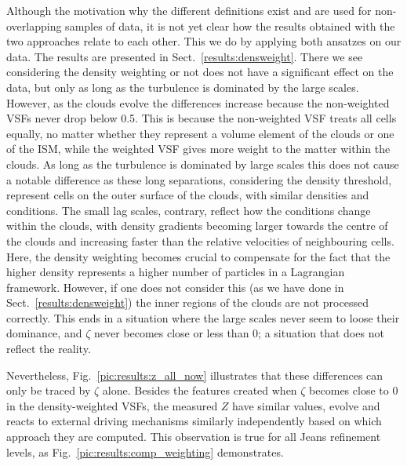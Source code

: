 Although the motivation why the different definitions exist and are used for non-overlapping samples of data, it is not yet clear how the results obtained with the two approaches relate to each other. 
This we do by applying both ansatzes on our data.
The results are presented in Sect.~\ref{results:densweight}.
There we see considering the density weighting or not does not have a significant effect on the data, but only as long as the turbulence is dominated by the large scales. 
However, as the clouds evolve the differences increase because the non-weighted VSFs never drop below 0.5.
This is because the non-weighted VSF treats all cells equally, no matter whether they represent a volume element of the clouds or one of the ISM, while the weighted VSF gives more weight to the matter within the clouds.
As long as the turbulence is dominated by large scales this does not cause a notable difference as these long separations, considering the density threshold, represent cells on the outer surface of the clouds, with similar densities and conditions.
The small lag scales, contrary, reflect how the conditions change within the clouds, with density gradients becoming larger towards the centre of the clouds and increasing faster than the relative velocities of neighbouring cells.
Here, the density weighting becomes crucial to compensate for the fact that the higher density represents a higher number of particles in a Lagrangian framework.
However, if one does not consider this (as we have done in Sect.~\ref{results:densweight}) the inner regions of the clouds are not processed correctly.
This ends in a situation where the large scales never seem to loose their dominance, and $\zeta$ never becomes close or less than 0; a situation that does not reflect the reality.

Nevertheless, Fig.~\ref{pic:results:z_all_now} illustrates that these differences can only be traced by $\zeta$ alone. 
Besides the features created when $\zeta$ becomes close to 0 in the density-weighted VSFs, the measured $Z$ have similar values, evolve and reacts to external driving mechanisms similarly independently based on which approach they are computed. 
This observation is true for all Jeans refinement levels, as Fig.~\ref{pic:results:comp_weighting} demonstrates.

